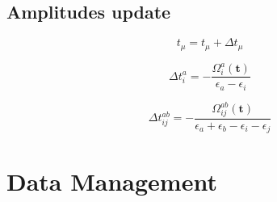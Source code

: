 \subsection{Amplitudes update}
\hypertarget{sec:ccsd_update}{}
\label{sec:ccsd_update}

\begin{equation}
  t_\mu = t_\mu + \Delta t_\mu
\end{equation}

\begin{equation}
  \Delta t_i^a = - \frac{\Omega_i^a(\mathbf{t})}{\epsilon_a - \epsilon_i}
\end{equation}

\begin{equation}
  \Delta t_{ij}^{ab} = -\frac{\Omega_{ij}^{ab}(\mathbf{t})}
  {\epsilon_a + \epsilon_b - \epsilon_i - \epsilon_j}
\end{equation}

\newpage
\section{Data Management}

